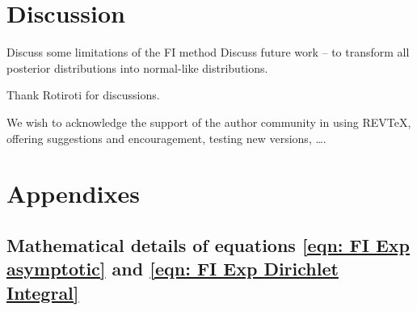 \documentclass[%
 reprint,
 amsmath,amssymb,
 aps,
]{revtex4-2}
\begin{document}
\section{\label{sec:discussion} Discussion}
Discuss some limitations of the FI method
Discuss future work -- to transform all posterior distributions into normal-like distributions.




\begin{acknowledgments}
Thank Rotiroti for discussions.

We wish to acknowledge the support of the author community in using
REV\TeX{}, offering suggestions and encouragement, testing new versions,
\dots.
\end{acknowledgments}

\appendix
\section{Appendixes}
\subsection{Mathematical details of equations \eqref{eqn: FI Exp asymptotic} and \eqref{eqn: FI Exp Dirichlet Integral}}
\label{subsec: maths details of the FI Exp example}
\end{document}
